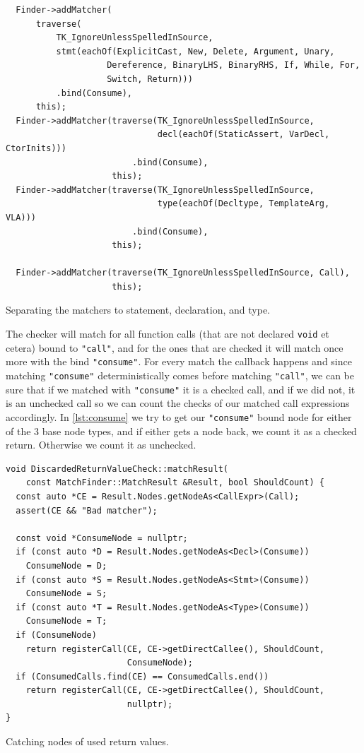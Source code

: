 \begin{listing}[H]
  \begin{verbatim}
  Finder->addMatcher(
	  traverse(
		  TK_IgnoreUnlessSpelledInSource,
		  stmt(eachOf(ExplicitCast, New, Delete, Argument, Unary,
					Dereference, BinaryLHS, BinaryRHS, If, While, For,
					Switch, Return)))
		  .bind(Consume),
	  this);
  Finder->addMatcher(traverse(TK_IgnoreUnlessSpelledInSource,
							  decl(eachOf(StaticAssert, VarDecl, CtorInits)))
					     .bind(Consume),
				     this);
  Finder->addMatcher(traverse(TK_IgnoreUnlessSpelledInSource,
							  type(eachOf(Decltype, TemplateArg, VLA)))
					     .bind(Consume),
				     this);

  Finder->addMatcher(traverse(TK_IgnoreUnlessSpelledInSource, Call),
                     this);
  \end{verbatim}
  \caption{Separating the matchers to statement, declaration, and type.}
\end{listing}

The checker will match for all function calls (that are not declared \texttt{void} et cetera) bound to \texttt{"call"}, and for the ones
that are checked it will match once more with the bind \texttt{"consume"}. For every match the callback happens and since matching \texttt{"consume"}
deterministically comes before matching \texttt{"call"}, we can be sure that if we matched with \texttt{"consume"} it is a checked call, and if we did
not, it is an unchecked call so we can count the checks of our matched call expressions accordingly. In \cref{lst:consume} we try to
get our \texttt{"consume"} bound node for either of the 3 base node types, and if either gets a node back, we count it as a checked return.
Otherwise we count it as unchecked.

\begin{listing}[H]
  \begin{verbatim}
void DiscardedReturnValueCheck::matchResult(
	const MatchFinder::MatchResult &Result, bool ShouldCount) {
  const auto *CE = Result.Nodes.getNodeAs<CallExpr>(Call);
  assert(CE && "Bad matcher");

  const void *ConsumeNode = nullptr;
  if (const auto *D = Result.Nodes.getNodeAs<Decl>(Consume))
    ConsumeNode = D;
  if (const auto *S = Result.Nodes.getNodeAs<Stmt>(Consume))
    ConsumeNode = S;
  if (const auto *T = Result.Nodes.getNodeAs<Type>(Consume))
    ConsumeNode = T;
  if (ConsumeNode)
    return registerCall(CE, CE->getDirectCallee(), ShouldCount,
                        ConsumeNode);
  if (ConsumedCalls.find(CE) == ConsumedCalls.end())
    return registerCall(CE, CE->getDirectCallee(), ShouldCount,
                        nullptr);
}
  \end{verbatim}
  \caption{Catching nodes of used return values.}\label{lst:consume}
\end{listing}

